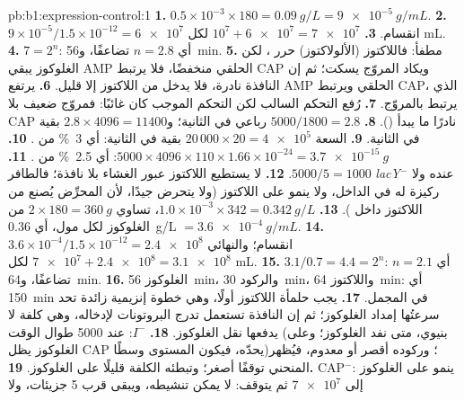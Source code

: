 \begin{solution}{pb:b1:expression-control:1}
\textbf{1.} $0.5\times 10^{-3}\times 180 = \qty{0.09}{g/L} =
\qty{9e-5}{g/mL}$.
\textbf{2.} $9\times 10^{-5}/1.5\times 10^{-12} = \num{6e7}$ انقسام.
\textbf{3.} $10^7 + \num{6e7} = \num{7e7}$  لكل mL.
\textbf{4.} $7 = 2^n$: أي $n = 2.8$ تضاعفًا، و\qty{56}{min}.
\textbf{5.} مطفأ: فاللاكتوز (الألولاكتوز) حرر ، لكن الغلوكوز
يبقي AMP الحلقي منخفضًا، فلا يرتبط CAP ويكاد المروّج يسكت؛ ثم إن
النافذة نادرة، فلا يدخل من اللاكتوز إلا قليل.
\textbf{6.} يرتفع AMP الحلقي ويرتبط  CAP، الذي يرتبط بالمروّج.
\textbf{7.} رُفع التحكم السالب لكن التحكم الموجب كان غائبًا: فمروّج
ضعيف بلا CAP نادرًا ما يبدأ ().
\textbf{8.} $5000/1800 = 2.8$ رباعي في الثانية؛ و$2.8\times 4096 =
\num{11400}$ بقية في الثانية.
\textbf{9.} السعة $20\,000\times 20 = \num{4e5}$ بقية في الثانية: أي
\qty{3}{\%} من .
\textbf{10.} $5000\times 4096\times 110\times 1.66\times 10^{-24} =
\qty{3.7e-15}{g}$: أي \qty{2.5}{\%} من  .
\textbf{11.} $5000/5 = 1000$.
\textbf{12.} لا يستطيع اللاكتوز عبور الغشاء بلا نافذة؛ فالطافر
\emph{lacY}$^-$ عنده  ولا ركيزة له في الداخل، ولا ينمو على
اللاكتوز (ولا يتحرض جيدًا، لأن المحرِّض يُصنع من اللاكتوز داخل
).
\textbf{13.} $1.0\times 10^{-3}\times 342 = \qty{0.342}{g/L}$، تساوي
$2\times 180 = \qty{360}{g}$ من الغلوكوز لكل مول، أي \qty{0.36}{g/L}
$= \qty{3.6e-4}{g/mL}$.
\textbf{14.} $3.6\times 10^{-4}/1.5\times 10^{-12} = \num{2.4e8}$
انقسام؛ والنهائي $\num{7e7} + \num{2.4e8} = \num{3.1e8}$ لكل mL.
\textbf{15.} $3.1/0.7 = 4.4 = 2^n$: أي $n = 2.1$ تضاعفًا، و\qty{64}{min}.
\textbf{16.} الغلوكوز \qty{56}{min}، والركود \qty{30}{min}، واللاكتوز
\qty{64}{min}: أي \qty{150}{min} في المجمل.
\textbf{17.} يجب حلمأة اللاكتوز أولًا، وهي خطوة إنزيمية زائدة تحد
سرعتُها إمداد الغلوكوز؛ ثم إن النافذة تستعمل تدرج البروتونات
لإدخاله، وهي كلفة لا يدفعها نقل الغلوكوز.
\textbf{18.} $I^-$:  عند \num{5000} طوال الوقت (بنيوي، متى
نفد الغلوكوز؛ وعلى الغلوكوز يظل CAP يحدّه، فيكون المستوى وسطًا)؛
وركوده أقصر أو معدوم، فيُظهر المنحني توقفًا أصغر؛ وتبطئه الكلفة
قليلًا على الغلوكوز.
\textbf{19.} CAP$^-$: ينمو على الغلوكوز إلى $\num{7e7}$ ثم يتوقف:
 لا يمكن تنشيطه، ويبقى  قرب 5 جزيئات، ولا

\end{solution}
